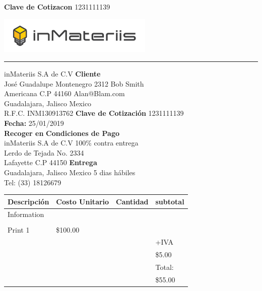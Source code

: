 \documentclass[12pt]{report}
\begin{document}
\begin{flushright} \textbf{Clave de Cotizacon} 1231111139\end{flushright}
\includegraphics[width=20em]{inmats.jpg}
\hrule
\vspace{1cm}
 
{\noindent
inMateriis S.A de C.V \hfill \textbf{Cliente} \hspace{10em} \\
Jos\'e Guadalupe Montenegro 2312 \hfill Bob Smith\hspace{8.5em} \\
Americana C.P 44160 \hfill Alan@Blam.com\hspace{8em} \\
Guadalajara, Jalisco Mexico \\
 
\noindent
R.F.C. INM130913762 \hfill \textbf{Clave de Cotizaci\'on} 1231111139 \\
\textbf{Fecha:} 25/01/2019 \\
 
\noindent
\textbf{Recoger en}  \hfill \textbf{Condiciones de Pago} \hspace{4em} \\
inMateriis S.A de C.V  \hfill 100\% contra entrega \hspace{5.5em} \\
Lerdo de Tejada No. 2334 \\
Lafayette C.P 44150  \hfill \textbf{Entrega} \hspace{10.5em} \\
Guadalajara, Jalisco Mexico   \hfill 5 dias h\'abiles \hspace{8.5em} \\
Tel: (33) 18126679\\
\begin{center}
\begin{large}
\begin{tabular}{| >{\centering\arraybackslash}m{3cm} | >{\centering\arraybackslash}m{4cm} | >{\centering\arraybackslash}m{2cm} |  >{\centering\arraybackslash}m{4cm}|} 
\hline
Descripci\'on & Costo Unitario & Cantidad & subtotal \\
\hline
Information & & &\\
& & &\\ 
Print 1 & \$100.00 &1 &  \\& & & +IVA \\ 
& & & \$5.00\\ 
& & & Total: \\ 
& & & \$55.00\\ 
 \hline
 \end{tabular}
 \end{large}
 

\end{center}}
\end{document}
